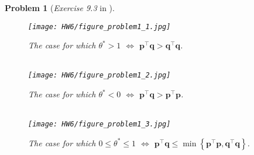 \documentclass[11pt]{article}
\newtheorem{problem}{Problem}
\numberwithin{equation}{problem}
\begin{document}
\begin{problem} [\emph{Exercise 9.3} in \cite{calafiore2014optimization}]
{\begin{figure}[h!]
    \centering
    \texttt{[image: HW6/figure\_problem1\_1.jpg]}
    \caption{The case for which $\theta^* > 1$ $\Leftrightarrow$ $\mathbf{p}^{\top} \mathbf{q} > \mathbf{q}^{\top} \mathbf{q}$.}
    \label{fig:problem1_1}
    \medskip \ \\
    \medskip
    \texttt{[image: HW6/figure\_problem1\_2.jpg]}
    \caption{The case for which $\theta^* < 0$ $\Leftrightarrow$ $\mathbf{p}^{\top} \mathbf{q} > \mathbf{p}^{\top} \mathbf{p}$.}
    \label{fig:problem1_2}
    \medskip \ \\
    \medskip
    \texttt{[image: HW6/figure\_problem1\_3.jpg]}
    \caption{The case for which $0 \leq \theta^* \leq 1$ $\Leftrightarrow$ $\mathbf{p}^{\top} \mathbf{q} \leq \min \left\{ \mathbf{p}^{\top} \mathbf{p}, \mathbf{q}^{\top} \mathbf{q} \right\}$.}
    \label{fig:problem1_3}
\end{figure}
}
\end{problem}
\end{document}
